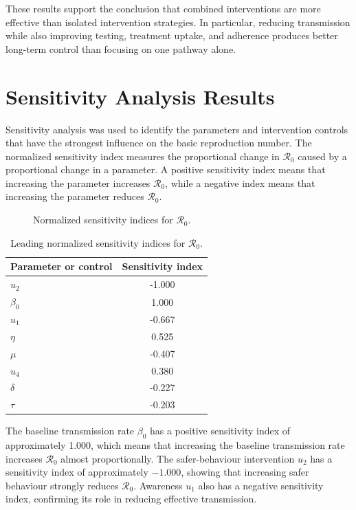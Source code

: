 \documentclass[12pt,a4paper,oneside]{report}
\begin{document}
These results support the conclusion that combined interventions are more effective than isolated intervention strategies. In particular, reducing transmission while also improving testing, treatment uptake, and adherence produces better long-term control than focusing on one pathway alone.

\section{Sensitivity Analysis Results}
Sensitivity analysis was used to identify the parameters and intervention controls that have the strongest influence on the basic reproduction number. The normalized sensitivity index measures the proportional change in $\mathcal{R}_0$ caused by a proportional change in a parameter. A positive sensitivity index means that increasing the parameter increases $\mathcal{R}_0$, while a negative index means that increasing the parameter reduces $\mathcal{R}_0$.

\begin{figure}[H]
\centering
{}
\caption{Normalized sensitivity indices for $\mathcal{R}_0$.}
\label{fig:sensitivity_indices}
\end{figure}

\begin{table}[H]
\centering
\caption{Leading normalized sensitivity indices for $\mathcal{R}_0$.}
\label{tab:sensitivity_results}
\begin{tabular}{lc}
\toprule
Parameter or control & Sensitivity index\\
\midrule
$u_2$ & -1.000\\
$\beta_0$ & 1.000\\
$u_1$ & -0.667\\
$\eta$ & 0.525\\
$\mu$ & -0.407\\
$u_4$ & 0.380\\
$\delta$ & -0.227\\
$\tau$ & -0.203\\
\bottomrule
\end{tabular}
\end{table}

The baseline transmission rate $\beta_0$ has a positive sensitivity index of approximately 1.000, which means that increasing the baseline transmission rate increases $\mathcal{R}_0$ almost proportionally. The safer-behaviour intervention $u_2$ has a sensitivity index of approximately $-1.000$, showing that increasing safer behaviour strongly reduces $\mathcal{R}_0$. Awareness $u_1$ also has a negative sensitivity index, confirming its role in reducing effective transmission.
\end{document}
